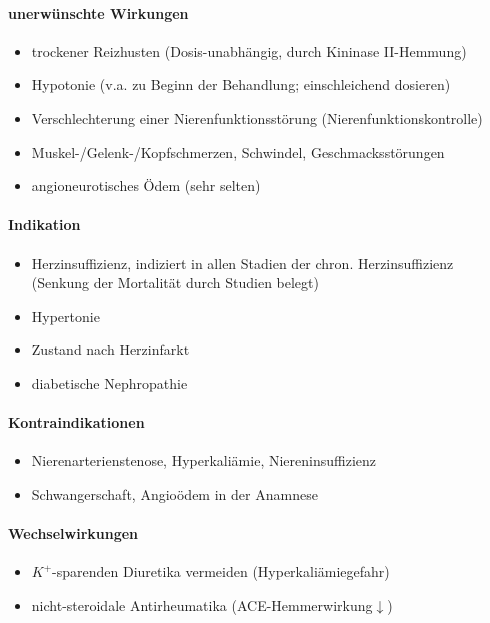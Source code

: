 \documentclass[10pt,a4paper]{report}
\begin{document}
\paragraph{unerwünschte Wirkungen}
\begin{itemize}
	\item trockener Reizhusten (Dosis-unabhängig, durch Kininase II-Hemmung)
	\item Hypotonie (v.a. zu Beginn der Behandlung; einschleichend dosieren)
	\item Verschlechterung einer Nierenfunktionsstörung (Nierenfunktionskontrolle)
	\item Muskel-/Gelenk-/Kopfschmerzen, Schwindel, Geschmacksstörungen
	\item angioneurotisches Ödem (sehr selten)
\end{itemize}
\paragraph{Indikation}
\begin{itemize}
	\item Herzinsuffizienz, indiziert in allen Stadien der chron. Herzinsuffizienz 
  (Senkung der Mortalität durch Studien belegt)
	\item Hypertonie
	\item Zustand nach Herzinfarkt
	\item diabetische Nephropathie
\end{itemize}
\paragraph{Kontraindikationen}
\begin{itemize}
	\item Nierenarterienstenose, Hyperkaliämie, Niereninsuffizienz
	\item Schwangerschaft, Angioödem in der Anamnese
\end{itemize}
\paragraph{Wechselwirkungen}
\begin{itemize}
	\item $K^+$-sparenden Diuretika vermeiden (Hyperkaliämiegefahr)
	\item nicht-steroidale Antirheumatika (ACE-Hemmerwirkung$\downarrow$)
\end{itemize}
\end{document}
